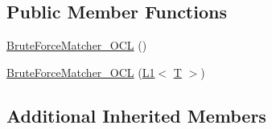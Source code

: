 \subsection*{Public Member Functions}
\begin{DoxyCompactItemize}
\item 
\hyperlink{classcv_1_1ocl_1_1BruteForceMatcher__OCL_3_01L1_3_01T_01_4_01_4_ab74465dc835f492e5b9705061f721a69}{Brute\-Force\-Matcher\-\_\-\-O\-C\-L} ()
\item 
\hyperlink{classcv_1_1ocl_1_1BruteForceMatcher__OCL_3_01L1_3_01T_01_4_01_4_a0655594c9415adbae3073fa55098aad4}{Brute\-Force\-Matcher\-\_\-\-O\-C\-L} (\hyperlink{structcv_1_1ocl_1_1L1}{L1}$<$ \hyperlink{calib3d_8hpp_a3efb9551a871ddd0463079a808916717}{T} $>$)
\end{DoxyCompactItemize}
\subsection*{Additional Inherited Members}


